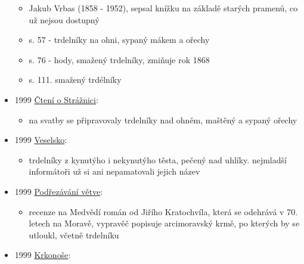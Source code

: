 \begin{itemize}
  \begin{itemize}
  \tightlist
  \item
    Jakub Vrbas (1858 - 1952), sepsal knížku na základě starých pramenů,
    co už nejsou dostupný
  \item
    s. 57 - trdelníky na ohni, sypaný mákem a ořechy
  \item
    s. 76 - hody, smažený trdelníky, zmiňuje rok 1868
  \item
    s. 111. smažený trdélníky
  \end{itemize}
\item
  1999
  \href{https://ceskadigitalniknihovna.cz/view/uuid:1205dd30-22f9-11ef-be46-0050568d319f?page=uuid\%3A744a56c4-b1cb-4846-840b-498bb5fc53a8&fulltext=trdeln\%C3\%ADk\%20OR\%20trdeln\%C3\%ADky\%20OR\%20trdeln\%C3\%ADk\%C5\%AF&source=mzk}{Čtení
  o Strážnici}:

  \begin{itemize}
  \tightlist
  \item
    na svatby se připravovaly trdelníky nad ohněm, maštěný a sypaný
    ořechy
  \end{itemize}
\item
  1999
  \href{https://ceskadigitalniknihovna.cz/view/uuid:9ee83d54-e4ea-4999-9b2d-7fd7bc1b19a1?page=uuid\%3A57ffd5a3-50a8-11e5-8200-0050569d679d&fulltext=trdeln\%C3\%ADk\%20OR\%20trdeln\%C3\%ADky\%20OR\%20trdeln\%C3\%ADk\%C5\%AF&source=mzk}{Veselsko}:

  \begin{itemize}
  \tightlist
  \item
    trdelníky z kynutýho i nekynutýho těsta, pečený nad uhlíky.
    nejmladší informátoři už si ani nepamatovali jejich název
  \end{itemize}
\item
  1999
  \href{https://ceskadigitalniknihovna.cz/view/uuid:42ab79d0-0672-11e4-83c7-005056827e51?page=uuid\%3A60685a60-33e0-11e4-8413-5ef3fc9ae867&fulltext=trdel*&source=nkp}{Podřezávání
  větve}:

  \begin{itemize}
  \tightlist
  \item
    recenze na Medvědí román od Jiřího Kratochvíla, která se odehrává v
    70. letech na Moravě, vypravěč popisuje arcimoravský krmě, po
    kterých by se utloukl, včetně trdelníku
  \end{itemize}
\item
  1999
  \href{https://ceskadigitalniknihovna.cz/uuid/uuid:688f803c-f890-4e66-986a-47d85c06d611}{Krkonoše}:


\end{itemize}
